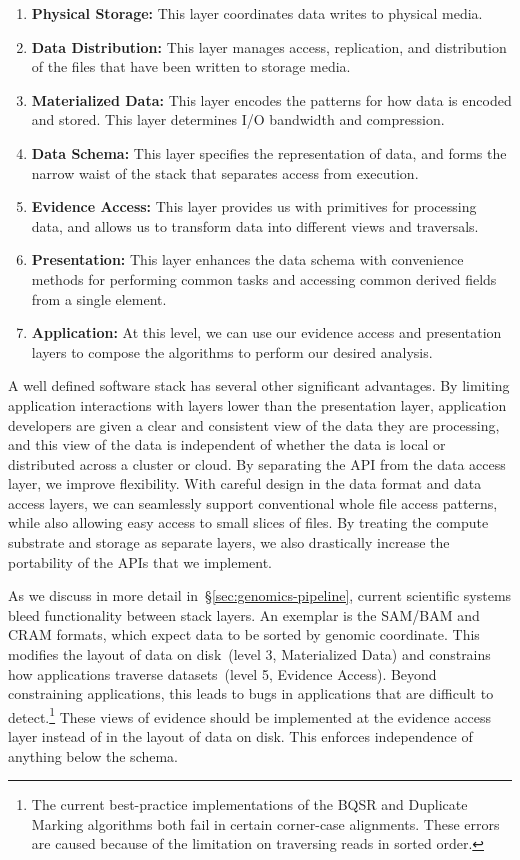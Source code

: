\documentclass[masters]{ucbthesis}
\begin{document}
\begin{enumerate}
\item \textbf{Physical Storage:} This layer coordinates data writes to physical media.
\item \textbf{Data Distribution:} This layer manages access, replication, and distribution of the files that have
been written to storage media.
\item \textbf{Materialized Data:} This layer encodes the patterns for how data is encoded and stored. This
layer determines I/O bandwidth and compression.
\item \textbf{Data Schema:} This layer specifies the representation of data, and forms the narrow waist of
the stack that separates access from execution.
\item \textbf{Evidence Access:} This layer provides us with primitives for processing data, and allows us to
transform data into different views and traversals.
\item \textbf{Presentation:} This layer enhances the data schema with convenience methods for performing
common tasks and accessing common derived fields from a single element.
\item \textbf{Application:} At this level, we can use our evidence access and presentation layers to compose
the algorithms to perform our desired analysis.
\end{enumerate}

A well defined software stack has several other significant advantages. By limiting application
interactions with layers lower than the presentation layer, application developers are given a clear and
consistent view of the data they are processing, and this view of the data is independent of whether the
data is local or distributed across a cluster or cloud. By separating the API from the data access layer,
we improve flexibility. With careful design in the data format and data access layers, we can seamlessly
support conventional whole file access patterns, while also allowing easy access to small slices of files.
By treating the compute substrate and storage as separate layers, we also drastically increase
the portability of the APIs that we implement.

As we discuss in more detail in~\S\ref{sec:genomics-pipeline}, current scientific systems bleed
functionality between stack layers. An exemplar is the SAM/BAM and CRAM formats, which expect data
to be sorted by genomic coordinate. This modifies the layout of data on disk~(level 3, Materialized Data)
and constrains how applications traverse datasets~(level 5, Evidence Access). Beyond
constraining applications, this leads to bugs in applications that are difficult to detect.\footnote{The
current best-practice implementations of the BQSR and Duplicate Marking algorithms both fail in certain
corner-case alignments. These errors are caused because of the limitation on traversing reads in sorted
order.} These views of evidence should be implemented at the evidence access layer instead of in the
layout of data on disk. This enforces independence of anything below the schema.
\end{document}
